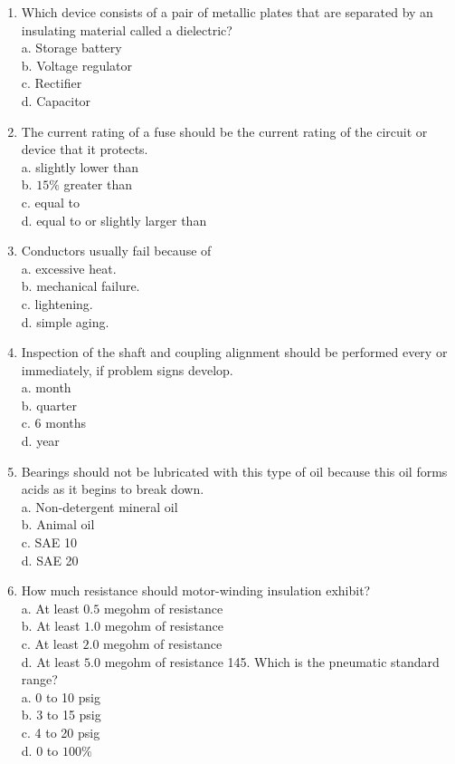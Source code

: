 \documentclass[10pt]{article}
\begin{document}
\begin{enumerate}
  \item Which device consists of a pair of metallic plates that are separated by an insulating material called a dielectric?\\
a. Storage battery\\
b. Voltage regulator\\
c. Rectifier\\
d. Capacitor

  \item The current rating of a fuse should be the current rating of the circuit or device that it protects.\\
a. slightly lower than\\
b. $15 \%$ greater than\\
c. equal to\\
d. equal to or slightly larger than

  \item Conductors usually fail because of\\
a. excessive heat.\\
b. mechanical failure.\\
c. lightening.\\
d. simple aging.

  \item Inspection of the shaft and coupling alignment should be performed every or immediately, if problem signs develop.\\
a. month\\
b. quarter\\
c. 6 months\\
d. year

  \item Bearings should not be lubricated with this type of oil because this oil forms acids as it begins to break down.\\
a. Non-detergent mineral oil\\
b. Animal oil\\
c. SAE 10\\
d. SAE 20

  \item How much resistance should motor-winding insulation exhibit?\\
a. At least $0.5$ megohm of resistance\\
b. At least $1.0$ megohm of resistance\\
c. At least $2.0$ megohm of resistance\\
d. At least $5.0$ megohm of resistance 145. Which is the pneumatic standard range?\\
a. 0 to 10 psig\\
b. 3 to 15 psig\\
c. 4 to 20 psig\\
d. 0 to $100 \%$


\end{enumerate}
\end{document}
